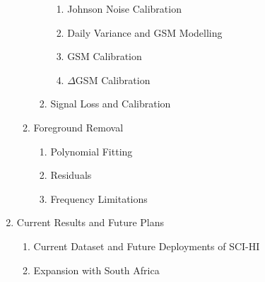 \documentclass[12pt,twoside]{report}
\begin{document}
\begin{enumerate}
\begin{enumerate}
\begin{enumerate}
\begin{enumerate}
\item Johnson Noise Calibration
\item Daily Variance and GSM Modelling
\item GSM Calibration
\item $\Delta$GSM Calibration

\end{enumerate}

\item \cm Signal Loss and Calibration

\end{enumerate}

\item Foreground Removal

\begin{enumerate}
\item Polynomial Fitting
\item Residuals
\item Frequency Limitations
\end{enumerate}

\end{enumerate}

\item Current Results and Future Plans

\begin{enumerate}
\item Current Dataset and Future Deployments of SCI-HI
\item Expansion with South Africa
\end{enumerate}

\end{enumerate}




%



%






%
\end{document}

